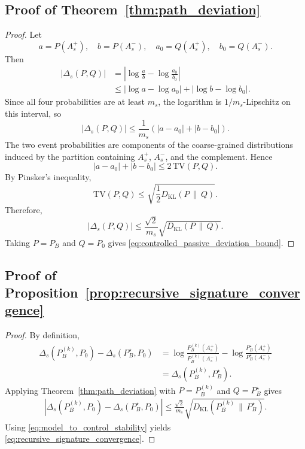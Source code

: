 \documentclass[
  aps,
  prresearch,
  reprint,
  amsmath,
  amssymb,
  superscriptaddress,
  nofootinbib,
  longbibliography
]{revtex4-2}
\def\EQSP{3pt}
\newcommand{\cgathers}[2][\EQSP]{\begingroup\setlength\abovedisplayskip{#1}\setlength\belowdisplayskip{#1}\begin{gather*} #2 \end{gather*}\endgroup\noindent}
\newcommand{\caligns}[2][\EQSP]{\begingroup\setlength\abovedisplayskip{#1}\setlength\belowdisplayskip{#1}\begin{align*} #2 \end{align*}\endgroup\noindent}
\newcommand{\KL}{D_{\mathrm{KL}}}
\newcommand{\TV}{\mathrm{TV}}
\begin{document}
\subsection{Proof of Theorem~\ref{thm:path_deviation}}
\begin{proof}
Let
\[
    a=P(A_s^+),\quad b=P(A_s^-),\quad
    a_0=Q(A_s^+),\quad b_0=Q(A_s^-).
\]
Then
\begin{align}
    |\Delta_s(P,Q)|
    &=
    \left|
    \log\frac{a}{b}-\log\frac{a_0}{b_0}
    \right|\\
    &\leq
    |\log a-\log a_0|
    +
    |\log b-\log b_0|.
\end{align}
Since all four probabilities are at least \(m_s\), the logarithm is \(1/m_s\)-Lipschitz on this interval, so
\begin{equation}
    |\Delta_s(P,Q)|
    \leq
    \frac{1}{m_s}\left(|a-a_0|+|b-b_0|\right).
\end{equation}
The two event probabilities are components of the coarse-grained distributions induced by the partition containing \(A_s^+\), \(A_s^-\), and the complement. Hence
\begin{equation}
    |a-a_0|+|b-b_0|
    \leq 2\,\TV(P,Q).
\end{equation}
By Pinsker's inequality,
\begin{equation}
    \TV(P,Q)
    \leq
    \sqrt{\frac{1}{2}\KL(P\,\|\,Q)}.
\end{equation}
Therefore,
\begin{equation}
    |\Delta_s(P,Q)|
    \leq
    \frac{\sqrt{2}}{m_s}
    \sqrt{\KL(P\,\|\,Q)}.
\end{equation}
Taking \(P=P_B\) and \(Q=P_0\) gives \eqref{eq:controlled_passive_deviation_bound}.
\end{proof}

\subsection{Proof of Proposition~\ref{prop:recursive_signature_convergence}}
\begin{proof}
By definition,
\caligns{
    \Delta_s(P_B^{(k)},P_0)
    -
    \Delta_s(P_B^\star,P_0)
    &=
    \log\frac{P_B^{(k)}(A_s^+)}{P_B^{(k)}(A_s^-)}
    -
    \log\frac{P_B^\star(A_s^+)}{P_B^\star(A_s^-)}\\
    &=
    \Delta_s(P_B^{(k)},P_B^\star).
}
Applying Theorem~\ref{thm:path_deviation} with \(P=P_B^{(k)}\) and \(Q=P_B^\star\) gives
\cgathers{
    \left|
    \Delta_s(P_B^{(k)},P_0)
    -
    \Delta_s(P_B^\star,P_0)
    \right|
    \leq
    \frac{\sqrt{2}}{m_s}
    \sqrt{\KL(P_B^{(k)}\,\|\,P_B^\star)}.}
Using \eqref{eq:model_to_control_stability} yields \eqref{eq:recursive_signature_convergence}.
\end{proof}
\end{document}
